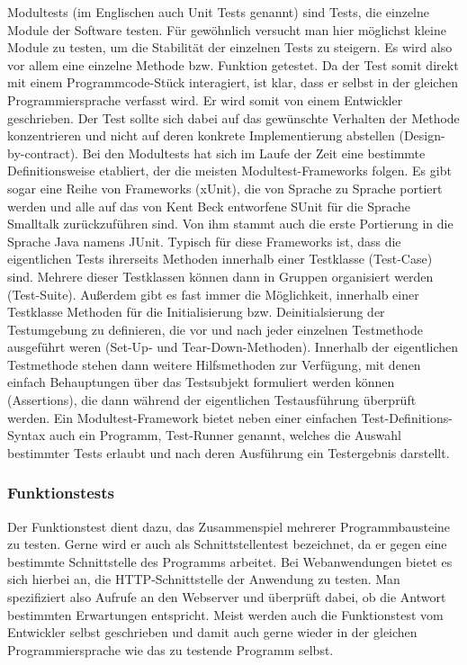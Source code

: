 Modultests (im Englischen auch Unit Tests genannt) sind Tests, die einzelne Module der Software testen. Für gewöhnlich versucht man hier möglichst kleine Module zu testen, um die Stabilität der einzelnen Tests zu steigern. Es wird also vor allem eine einzelne Methode bzw. Funktion getestet. Da der Test somit direkt mit einem Programmcode-Stück interagiert, ist klar, dass er selbst in der gleichen Programmiersprache verfasst wird. Er wird somit von einem Entwickler geschrieben. Der Test sollte sich dabei auf das gewünschte Verhalten der Methode konzentrieren und nicht auf deren konkrete Implementierung abstellen (Design-by-contract). Bei den Modultests hat sich im Laufe der Zeit eine bestimmte Definitionsweise etabliert, der die meisten Modultest-Frameworks folgen. Es gibt sogar eine Reihe von Frameworks (xUnit), die von Sprache zu Sprache portiert werden und alle auf das von Kent Beck entworfene SUnit für die Sprache Smalltalk zurückzuführen sind. Von ihm stammt auch die erste Portierung in die Sprache Java namens JUnit. Typisch für diese Frameworks ist, dass die eigentlichen Tests ihrerseits Methoden innerhalb einer Testklasse (Test-Case) sind. Mehrere dieser Testklassen können dann in Gruppen organisiert werden (Test-Suite). Außerdem gibt es fast immer die Möglichkeit, innerhalb einer Testklasse Methoden für die Initialisierung bzw. Deinitialsierung der Testumgebung zu definieren, die vor und nach jeder einzelnen Testmethode ausgeführt weren (Set-Up- und Tear-Down-Methoden). Innerhalb der eigentlichen Testmethode stehen dann weitere Hilfsmethoden zur Verfügung, mit denen einfach Behauptungen über das Testsubjekt formuliert werden können (Assertions), die dann während der eigentlichen Testausführung überprüft werden. Ein Modultest-Framework bietet neben einer einfachen Test-Definitions-Syntax auch ein Programm, Test-Runner genannt, welches die Auswahl bestimmter Tests erlaubt und nach deren Ausführung ein Testergebnis darstellt.

\subsubsection{Funktionstests}

Der Funktionstest dient dazu, das Zusammenspiel mehrerer Programmbausteine zu testen. Gerne wird er auch als Schnittstellentest bezeichnet, da er gegen eine bestimmte Schnittstelle des Programms arbeitet. Bei Webanwendungen bietet es sich hierbei an, die HTTP-Schnittstelle der Anwendung zu testen. Man spezifiziert also Aufrufe an den Webserver und überprüft dabei, ob die Antwort bestimmten Erwartungen entspricht. Meist werden auch die Funktionstest vom Entwickler selbst geschrieben und damit auch gerne wieder in der gleichen Programmiersprache wie das zu testende Programm selbst.


